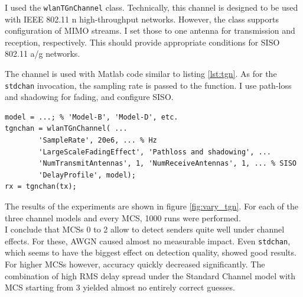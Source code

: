 I used the \texttt{wlanTGnChannel} class. Technically, this channel is designed to be used with IEEE 802.11 n high-throughput networks. However, the class supports configuration of \gls{MIMO} streams. I set those to one antenna for transmission and reception, respectively. This should provide appropriate conditions for \gls{SISO} 802.11 a/g networks.

The channel is used with Matlab code similar to listing \ref{lst:tgn}. As for the \texttt{stdchan} invocation, the sampling rate is passed to the function. I use path-loss and shadowing for fading, and configure \gls{SISO}.

\begin{lstlisting}[captionpos=b,caption={Matlab wlanTGnChannel Simulation},label=lst:tgn]
model = ...; % 'Model-B', 'Model-D', etc.
tgnchan = wlanTGnChannel( ...
        'SampleRate', 20e6, ... % Hz
        'LargeScaleFadingEffect', 'Pathloss and shadowing', ...
        'NumTransmitAntennas', 1, 'NumReceiveAntennas', 1, ... % SISO
        'DelayProfile', model);
rx = tgnchan(tx);
\end{lstlisting}

The results of the experiments are shown in figure \ref{fig:vary_tgn}. For each of the three channel models and every \gls{MCS}, 1000 runs were performed.\\

I conclude that \glspl{MCS} 0 to 2 allow to detect senders quite well under channel effects. For these, \gls{AWGN} caused almost no measurable impact. Even \texttt{stdchan}, which seems to have the biggest effect on detection quality, showed good results. For higher \glspl{MCS} however, accuracy quickly decreased significantly. The combination of high \gls{RMS} delay spread under the Standard Channel model with \gls{MCS} starting from 3 yielded almost no entirely correct guesses.

